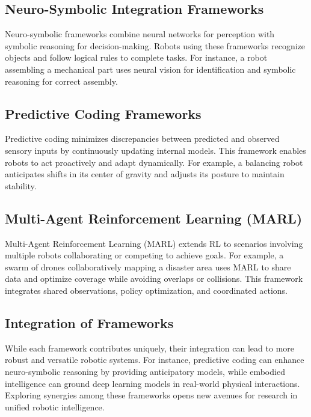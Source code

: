     \subsection{Neuro-Symbolic Integration Frameworks}
    Neuro-symbolic frameworks combine neural networks for perception with symbolic reasoning for decision-making. Robots using these frameworks recognize objects and follow logical rules to complete tasks. For instance, a robot assembling a mechanical part uses neural vision for identification and symbolic reasoning for correct assembly. \cite{garcez-2019-neuro-symbolic}
    
    \subsection{Predictive Coding Frameworks}
    Predictive coding minimizes discrepancies between predicted and observed sensory inputs by continuously updating internal models. This framework enables robots to act proactively and adapt dynamically. For example, a balancing robot anticipates shifts in its center of gravity and adjusts its posture to maintain stability. \cite{rao-1999-predictive-coding}
    
    \subsection{Multi-Agent Reinforcement Learning (MARL)}
    Multi-Agent Reinforcement Learning (MARL) extends RL to scenarios involving multiple robots collaborating or competing to achieve goals. For example, a swarm of drones collaboratively mapping a disaster area uses MARL to share data and optimize coverage while avoiding overlaps or collisions. This framework integrates shared observations, policy optimization, and coordinated actions. \cite{busoniu-2008-marl}
    
    \subsection{Integration of Frameworks}
    While each framework contributes uniquely, their integration can lead to more robust and versatile robotic systems. For instance, predictive coding can enhance neuro-symbolic reasoning by providing anticipatory models, while embodied intelligence can ground deep learning models in real-world physical interactions. Exploring synergies among these frameworks opens new avenues for research in unified robotic intelligence.

    
